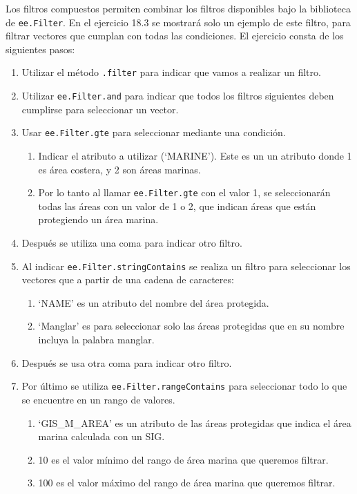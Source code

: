 \documentclass[
  12pt,
  letterpaper,
  twoside]{book}
\providecommand{\tightlist}{%
  \setlength{\itemsep}{0pt}\setlength{\parskip}{0pt}}
\begin{document}
Los filtros compuestos permiten combinar los filtros disponibles bajo la biblioteca de \texttt{ee.Filter}. En el ejercicio 18.3 se mostrará solo un ejemplo de este filtro, para filtrar vectores que cumplan con todas las condiciones. El ejercicio consta de los siguientes pasos:

\begin{enumerate}
\def\labelenumi{\arabic{enumi}.}
\tightlist
\item
  Utilizar el método \texttt{.filter} para indicar que vamos a realizar un filtro.
\item
  Utilizar \texttt{ee.Filter.and} para indicar que todos los filtros siguientes deben cumplirse para seleccionar un vector.
\item
  Usar \texttt{ee.Filter.gte} para seleccionar mediante una condición.

  \begin{enumerate}
  \def\labelenumii{\alph{enumii}.}
  \tightlist
  \item
    Indicar el atributo a utilizar (`MARINE'). Este es un un atributo donde 1 es área costera, y 2 son áreas marinas.
  \item
    Por lo tanto al llamar \texttt{ee.Filter.gte} con el valor 1, se seleccionarán todas las áreas con un valor de 1 o 2, que indican áreas que están protegiendo un área marina.
  \end{enumerate}
\item
  Después se utiliza una coma para indicar otro filtro.
\item
  Al indicar \texttt{ee.Filter.stringContains} se realiza un filtro para seleccionar los vectores que a partir de una cadena de caracteres:

  \begin{enumerate}
  \def\labelenumii{\alph{enumii}.}
  \tightlist
  \item
    `NAME' es un atributo del nombre del área protegida.
  \item
    `Manglar' es para seleccionar solo las áreas protegidas que en su nombre incluya la palabra manglar.
  \end{enumerate}
\item
  Después se usa otra coma para indicar otro filtro.
\item
  Por último se utiliza \texttt{ee.Filter.rangeContains} para seleccionar todo lo que se encuentre en un rango de valores.

  \begin{enumerate}
  \def\labelenumii{\alph{enumii}.}
  \tightlist
  \item
    `GIS\_M\_AREA' es un atributo de las áreas protegidas que indica el área marina calculada con un SIG.
  \item
    10 es el valor mínimo del rango de área marina que queremos filtrar.
  \item
    100 es el valor máximo del rango de área marina que queremos filtrar.
  \end{enumerate}
\end{enumerate}
\end{document}

